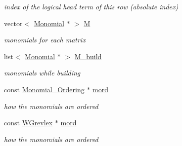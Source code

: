\begin{DoxyCompactItemize}
\begin{DoxyCompactList}\small\item\em index of the logical head term of this row (absolute index) \end{DoxyCompactList}\item 
\mbox{\label{group___g_b_computation_a7dac72addf3ef8ff2c87c247a90eaa9d}} 
vector$<$ \hyperlink{group__polygroup_class_monomial}{Monomial} $\ast$ $>$ \hyperlink{group___g_b_computation_a7dac72addf3ef8ff2c87c247a90eaa9d}{M}
\begin{DoxyCompactList}\small\item\em monomials for each matrix \end{DoxyCompactList}\item 
\mbox{\label{group___g_b_computation_aee58b978a10b26bbdf1d518e6eb25fb5}} 
list$<$ \hyperlink{group__polygroup_class_monomial}{Monomial} $\ast$ $>$ \hyperlink{group___g_b_computation_aee58b978a10b26bbdf1d518e6eb25fb5}{M\+\_\+build}
\begin{DoxyCompactList}\small\item\em monomials while building \end{DoxyCompactList}\item 
\mbox{\label{group___g_b_computation_a4f684766174bbefa4d04df3fa894ad1d}} 
const \hyperlink{group__orderinggroup_class_monomial___ordering}{Monomial\+\_\+\+Ordering} $\ast$ \hyperlink{group___g_b_computation_a4f684766174bbefa4d04df3fa894ad1d}{mord}
\begin{DoxyCompactList}\small\item\em how the monomials are ordered \end{DoxyCompactList}\item 
\mbox{\label{group___g_b_computation_a531a462792fba821e13a63c7376c35cf}} 
const \hyperlink{group__orderinggroup_class_w_grevlex}{W\+Grevlex} $\ast$ \hyperlink{group___g_b_computation_a531a462792fba821e13a63c7376c35cf}{mord}
\begin{DoxyCompactList}\small\item\em how the monomials are ordered \end{DoxyCompactList}\item 
\mbox{\label{group___g_b_computation_a55db3cd23309e08acfbce3b6d2feec85}} 

\end{DoxyCompactItemize}

